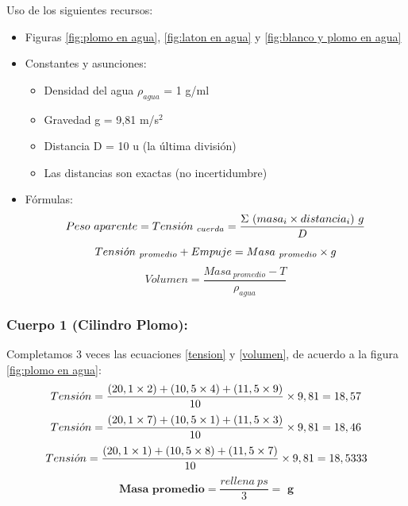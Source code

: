 \documentclass[10pt]{article}
\begin{document}
Uso de los siguientes recursos:    
\begin{itemize}
    
    \item Figuras \ref{fig:plomo en agua}, \ref{fig:laton en agua} y           \ref{fig:blanco y plomo en agua}
    
    \item Constantes y asunciones:
        \begin{itemize}
            \item Densidad del agua $\rho_{agua}$ = 1 g/ml
            \item Gravedad g = 9,81 m/s$^{2}$
            \item Distancia D = 10 u (la última división)
            \item Las distancias son exactas (no incertidumbre)
        \end{itemize}
    
    \item Fórmulas:
    \large
    {\begin{equation}
        \label{tension}
        Peso~aparente = Tensi\Acute{o}n_{~cuerda}= \frac{\Sigma~(masa_{i} \times distancia_{i})~g}{D}
    \end{equation}
    \vspace{-0.1cm}
    \begin{equation*}
        Tensi\Acute{o}n_{~promedio} + Empuje = Masa_{~promedio} \times g 
    \end{equation*}
    \vspace{-0.2cm}
    \begin{equation}
        \label{volumen}
        Volumen = \frac{Masa_{~promedio} - T}{\rho_{agua}} 
    \end{equation}}
\end{itemize}

\subsubsection{Cuerpo 1 (Cilindro Plomo):}
\vspace{0,2cm}

Completamos 3 veces las ecuaciones \ref{tension} y \ref{volumen}, de acuerdo a la figura \ref{fig:plomo en agua}:\\

\begin{equation*}
    Tensi\Acute{o}n = \frac{(20,1\times2)+(10,5\times4)+(11,5\times9)}{10}\times9,81 = 18,57
\end{equation*}
\begin{equation*}
    Tensi\Acute{o}n = \frac{(20,1\times7)+(10,5\times1)+(11,5\times3)}{10}\times9,81 = 18,46
\end{equation*}
\begin{equation*}
    Tensi\Acute{o}n = \frac{(20,1\times1)+(10,5\times8)+(11,5\times7)}{10}\times9,81 = 18,5333
\end{equation*}
\vspace{0.2cm}
\begin{equation*}
    \textbf{Masa~promedio}= \frac{rellena~ps}{3} = \textbf{~g}
\end{equation*}
\vspace{0.1cm}
\end{document}

